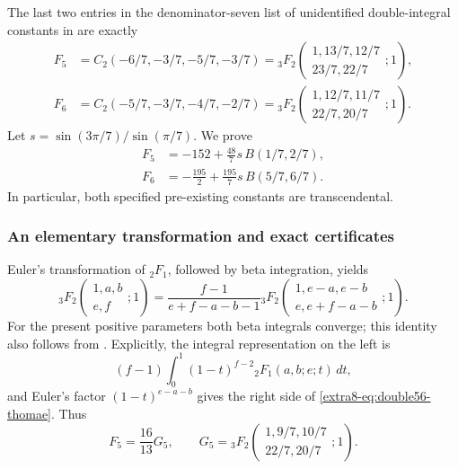 \documentclass[11pt,a4paper]{article}
\theoremstyle{definition}
\theoremstyle{remark}
\numberwithin{equation}{section}
\begin{document}
The last two entries in the denominator-seven list of unidentified
double-integral constants in \cite[p.~14]{extra8-dbkz} are exactly
\begin{align*}
 F_5&=C_2(-6/7,-3/7,-5/7,-3/7)
 ={}_3F_2\!\left(\begin{matrix}1,13/7,12/7\\23/7,22/7\end{matrix};1\right),\\
 F_6&=C_2(-5/7,-3/7,-4/7,-2/7)
 ={}_3F_2\!\left(\begin{matrix}1,12/7,11/7\\22/7,20/7\end{matrix};1\right).
\end{align*}
Let $s=\sin(3\pi/7)/\sin(\pi/7)$. We prove
\begin{equation}\label{extra8-eq:double56-evaluation}
 \boxed{\begin{aligned}
 F_5&=-152+\frac{48}{7}s\,B(1/7,2/7),\\
 F_6&=-\frac{195}{2}+\frac{195}{7}s\,B(5/7,6/7).
 \end{aligned}}
\end{equation}
In particular, both specified pre-existing constants are transcendental.

\subsubsection{An elementary transformation and exact certificates}

Euler's transformation of ${}_2F_1$, followed by beta integration, yields
\begin{equation}\label{extra8-eq:double56-thomae}
 {}_3F_2\!\left(\begin{matrix}1,a,b\\e,f\end{matrix};1\right)
 =\frac{f-1}{e+f-a-b-1}
 {}_3F_2\!\left(\begin{matrix}1,e-a,e-b\\e,e+f-a-b\end{matrix};1\right).
\end{equation}
For the present positive parameters both beta integrals converge; this
identity also follows from \cite[Eq.~16.4.11]{extra8-dlmf}. Explicitly, the integral
representation on the left is
\[
 (f-1)\int_0^1(1-t)^{f-2}{}_2F_1(a,b;e;t)\,dt,
\]
and Euler's factor $(1-t)^{e-a-b}$ gives the right side of
\eqref{extra8-eq:double56-thomae}. Thus
\[
 F_5=\frac{16}{13}G_5,\qquad
 G_5={}_3F_2\!\left(\begin{matrix}1,9/7,10/7\\22/7,20/7\end{matrix};1\right).
\]
\end{document}
